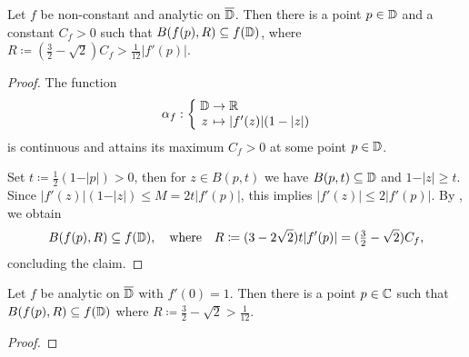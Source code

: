 \begin{theorem} \label{thm:bloch-stronger}
    Let $f$ be non-constant and analytic on $\overline{\mathbb{D}}$. Then there is a point $p \in \mathbb{D}$ and a constant $C_f > 0$ such that $B(f(p), R) \subseteq f(\mathbb{D})$, where $R \coloneqq (\frac{3}{2} - \sqrt{2}) C_f > \frac{1}{12} \vert f'(p) \vert$.
\end{theorem}

\begin{proof}
    The function
    $$ \mapping{\alpha_f}{\D & \to & \R}{z & \mapsto & \vert f'(z) \vert (1 - \vert z \vert)} $$
    is continuous and attains its maximum $C_f > 0$ at some point $p \in \mathbb{D}$.
    
    Set $t \coloneqq \frac{1}{2}(1 - \vert p \vert) > 0$, then for $z \in B(p, t)$ we have $B(p, t) \subseteq \mathbb{D}$ and $1 - \vert z \vert \geq t$. Since $\vert f'(z) \vert (1 - \vert z \vert) \leq M = 2 t \vert f'(p) \vert$, this implies $\vert f'(z) \vert \leq 2 \vert f'(p) \vert$. By , we obtain
    $$ B(f(p), R) \subseteq f(\mathbb{D}), \quad \textrm{where} \quad R \coloneqq (3 - 2 \sqrt{2}) t \vert f'(p) \vert = ({\textstyle \frac{3}{2}} - \sqrt{2}) C_f, $$
    concluding the claim.
\end{proof}



\begin{theorem}[Bloch] \label{thm:bloch}
    Let $f$ be analytic on $\overline{\mathbb{D}}$ with $f'(0) = 1$. Then there is a point $p \in \mathbb{C}$ such that $B(f(p), R) \subseteq f(\mathbb{D})$ where $R \coloneqq \frac{3}{2} - \sqrt{2} > \frac{1}{12}$.
\end{theorem}

\begin{proof}
\end{proof}